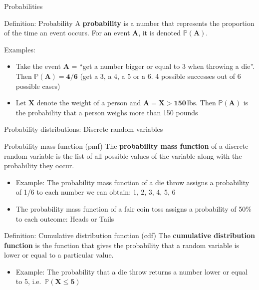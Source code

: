 \documentclass[
  ignorenonframetext,
  aspectratio=169]{beamer}
\providecommand{\tightlist}{%
  \setlength{\itemsep}{0pt}\setlength{\parskip}{0pt}}
\begin{document}
\begin{frame}{Probabilities}
\protect\hypertarget{probabilities}{}
\begin{block}{Definition: Probability}
A \textbf{probability} is a number that represents the proportion of the time an event occurs. For an event \textbf{A}, it is denoted $\bm{\mathbb{P}(A)}$.
\end{block}

Examples:

\begin{itemize}
\tightlist
\item
  Take the event \textbf{A} = ``get a number bigger or equal to 3 when
  throwing a die''. Then \(\bm{\mathbb{P}(A) = 4/6}\) (get a 3, a 4, a 5
  or a 6. 4 possible successes out of 6 possible cases)
\item
  Let \(\bm{X}\) denote the weight of a person and
  \(\bm{A = X>150} \,\textrm{lbs}\). Then \(\bm{\mathbb{P}(A)}\) is the
  probability that a person weighs more than 150 pounds
\end{itemize}
\end{frame}

\begin{frame}{Probability distributions: Discrete random variables}
\protect\hypertarget{probability-distributions-discrete-random-variables}{}
\label{discrete}

\begin{block}{Probability mass function (pmf)}
The \textbf{probability mass function} of a discrete random variable is the list of all possible values of the variable along with the probability they occur.
\end{block}

\begin{itemize}
\tightlist
\item
  Example: The probability mass function of a die throw assigns a
  probability of 1/6 to each number we can obtain: 1, 2, 3, 4, 5, 6
\item
  The probability mass function of a fair coin toss assigns a
  probability of 50\% to each outcome: Heads or Tails
\end{itemize}

\begin{block}{Definition: Cumulative distribution function (cdf)}
The \textbf{cumulative distribution function} is the function that gives the probability that a random variable is lower or equal to a particular value.
\end{block}

\begin{itemize}
\tightlist
\item
  Example: The probability that a die throw returns a number lower or
  equal to 5, i.e.~\(\bm{\mathbb{P}(X \leq 5)}\)
\end{itemize}
\end{frame}
\end{document}
